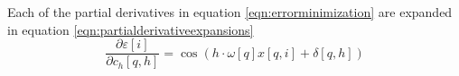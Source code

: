 \documentclass{article}
\begin{document}
\par{Each of the partial derivatives in equation \eqref{eqn:errorminimization} are expanded in equation \eqref{eqn:partialderivativeexpansions}}
\begin{subequations}
\label{eqn:partialderivativeexpansions}
\begin{equation}
\frac{\partial \varepsilon\left[ i \right]}{\partial c_h\left[q, h\right]} = \cos\left( h \cdot \omega\left[q\right] x\left[q, i\right] + \delta\left[q, h\right] \right)
\end{equation}
\end{subequations}
\end{document}

